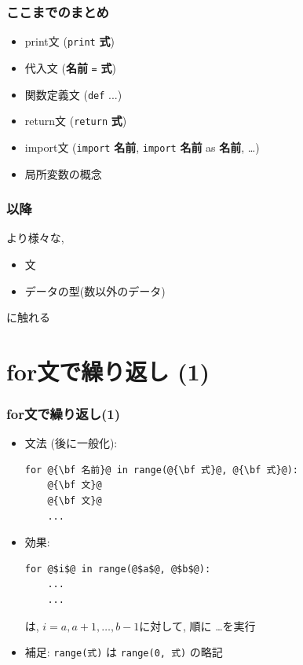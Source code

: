 \documentclass[10pt,dvipdfmx]{beamer}
\begin{document}
\fi



\begin{frame}
\frametitle{ここまでのまとめ}
\begin{itemize}
\item print文 ({\tt print} {\bf 式})
\item 代入文  ({\bf 名前} {\tt =} {\bf 式})
\item 関数定義文 ({\tt def} ...)
\item return文 ({\tt return} {\bf 式})
\item import文 ({\tt import} {\bf 名前}, {\tt import} {\bf 名前} as {\bf 名前}, \ldots)
\item 局所変数の概念
\end{itemize}
\end{frame}


\begin{frame}
\frametitle{以降}
より様々な,
\begin{itemize}
\item 文
\item データの型(数以外のデータ)
\end{itemize}
に触れる
\end{frame}

\section{for文で繰り返し (1)}

\begin{frame}[fragile]
\frametitle{for文で繰り返し(1)}
\begin{itemize}
\item 文法 (後に一般化):
\begin{lstlisting}
for @{\bf 名前}@ in range(@{\bf 式}@, @{\bf 式}@):
    @{\bf 文}@
    @{\bf 文}@
    ...
\end{lstlisting}
\item 効果:
\begin{lstlisting}
for @$i$@ in range(@$a$@, @$b$@):
    ...
    ...
\end{lstlisting}
は, $i = a, a+1, \ldots , b-1$に対して, 順に \ldots を実行

\item 補足: {\tt range(式)} は {\tt range(0, 式)} の略記
\end{itemize}
\end{frame}
\end{document}
